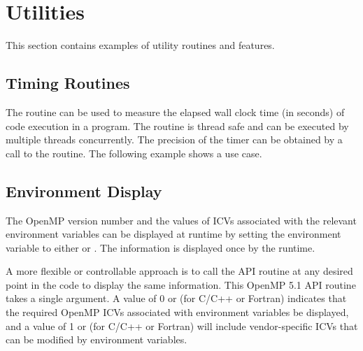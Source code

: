 \pagebreak
\section{Utilities}
\label{sec:utilities}
This section contains examples of utility routines and features.

\subsection{Timing Routines}
\label{subsec:get_wtime}

The  routine can be used to measure the elapsed wall
clock time (in seconds) of code execution in a program.
The routine is thread safe and can be executed by multiple threads concurrently.
The precision of the timer can be obtained by a call to
the  routine. The following example shows a use case.




\subsection{Environment Display}
\label{subsec:display_env}

The OpenMP version number and the values of ICVs associated with the relevant
environment variables can be displayed at runtime by setting 
the  environment variable to either 
 or .
The information is displayed once by the runtime.

A more flexible or controllable approach is to call 
the  API routine at any desired
point in the code to display the same information.
This OpenMP 5.1 API routine takes a single  argument.
A value of 0 or  (for C/C++ or Fortran) indicates that
the required OpenMP ICVs associated with environment variables be displayed,
and a value of 1 or  (for C/C++ or Fortran) will include
vendor-specific ICVs that can be modified by environment variables.

